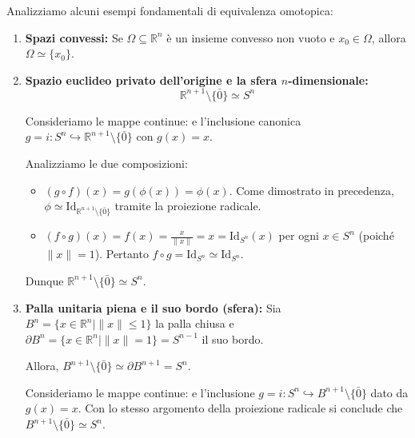 \vspace{1.5em}

\begin{ejemplo}
Analizziamo alcuni esempi fondamentali di equivalenza omotopica:

\begin{enumerate}
    \item \textbf{Spazi convessi:} Se $\Omega \subseteq \mathbb{R}^n$ è un insieme convesso non vuoto e $x_0 \in \Omega$, allora $\Omega \simeq \{x_0\}$.
    

    \item \textbf{Spazio euclideo privato dell'origine e la sfera $n$-dimensionale:}
    \[
    \mathbb{R}^{n+1} \setminus \{\bar{0}\} \simeq S^n
    \]
    
    Consideriamo le mappe continue:
    e l'inclusione canonica $g = i: S^n \hookrightarrow \mathbb{R}^{n+1} \setminus \{\bar{0}\}$ con $g(x) = x$.

    Analizziamo le due composizioni:
    \begin{itemize}
        \item $(g \circ f)(x) = g(\phi(x)) = \phi(x)$. Come dimostrato in precedenza, $\phi \simeq \mathrm{Id}_{\mathbb{R}^{n+1} \setminus \{\bar{0}\}}$ tramite la proiezione radicale.
        \item $(f \circ g)(x) = f(x) = \frac{x}{\|x\|} = x = \mathrm{Id}_{S^n}(x)$ per ogni $x \in S^n$ (poiché $\|x\| = 1$). Pertanto $f \circ g = \mathrm{Id}_{S^n} \simeq \mathrm{Id}_{S^n}$.
    \end{itemize}
    Dunque $\mathbb{R}^{n+1} \setminus \{\bar{0}\} \simeq S^n$.

    \item \textbf{Palla unitaria piena e il suo bordo (sfera):}
    Sia $B^n = \{x \in \mathbb{R}^n \mid \|x\| \leqslant 1\}$ la palla chiusa e $\partial B^n = \{x \in \mathbb{R}^n \mid \|x\| = 1\} = S^{n-1}$ il suo bordo.
    
    Allora, $B^{n+1} \setminus \{\bar{0}\} \simeq \partial B^{n+1} = S^n$.

    Consideriamo le mappe continue:
    e l'inclusione $g = i: S^n \hookrightarrow B^{n+1} \setminus \{\bar{0}\}$ dato da $g(x) = x$. Con lo stesso argomento della proiezione radicale si conclude che $B^{n+1} \setminus \{\bar{0}\} \simeq S^n$.
\end{enumerate}
\end{ejemplo}

